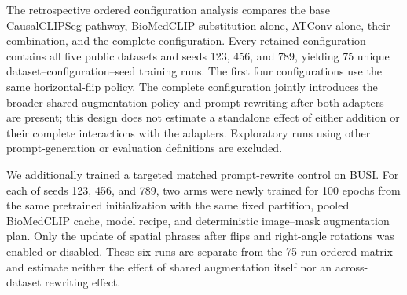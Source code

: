 The retrospective ordered configuration analysis compares the base
CausalCLIPSeg pathway, BioMedCLIP substitution alone, ATConv alone, their
combination, and the complete \methodname{} configuration. Every retained
configuration contains all five public datasets and seeds 123, 456, and 789,
yielding 75 unique dataset--configuration--seed training runs. The first four
configurations use the same horizontal-flip policy. The complete configuration
jointly introduces the broader shared augmentation policy and prompt rewriting
after both adapters are present; this design does not estimate a standalone
effect of either addition or their complete interactions with the adapters.
Exploratory runs using other prompt-generation or evaluation definitions are
excluded.

We additionally trained a targeted matched prompt-rewrite control on BUSI. For
each of seeds 123, 456, and 789, two arms were newly trained for 100 epochs from
the same pretrained initialization with the same fixed partition, pooled
BioMedCLIP cache, model recipe, and deterministic image--mask augmentation plan.
Only the update of spatial phrases after flips and right-angle rotations was
enabled or disabled. These six runs are separate from the 75-run ordered matrix
and estimate neither the effect of shared augmentation itself nor an
across-dataset rewriting effect.

